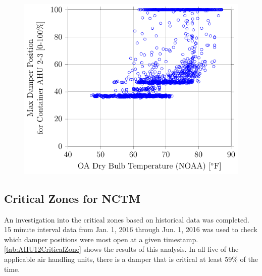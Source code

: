 \begin{figure}
\centering
\includegraphics[]{Plots/2016-06-06-1454-MaxDamperPositionforContainerAHU23vsOADryBulbTemperatureNOAA.pdf}
\caption{}
\label{fig:MaxDamperPositionforContainerAHU23vsOADryBulbTemperatureNOAA}
\end{figure}


\subsection{Critical Zones for NCTM}

An investigation into the critical zones based on historical data was completed. 15 minute interval data from Jan. 1, 2016 through Jun. 1, 2016 was used to check which damper positions were most open at a given timestamp. \tableref{} \ref{tab:AHU12CriticalZone} shows the results of this analysis. In all five of the applicable air handling units, there is a damper that is critical at least 59\% of the time. 


